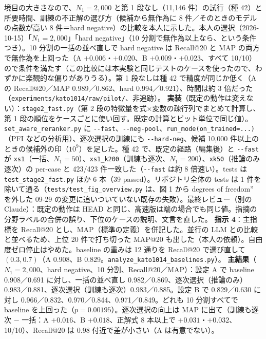 \documentclass[11pt,a4paper]{jsarticle}
\begin{document}
\begin{itemize}[nosep]
    境目の大きさなので、$N_1 = 2{,}000$ と第 1 段なし（11{,}146 件）の試行（種 42）と所要時間、訓練の不正解の選び方（候補から無作為に 8 件／そのときのモデルの点数が高い 8 件＝hard negative）の比較を本人に示した。本人の選択（2026-10-15）「$N_1 = 2{,}000$」「hard negative」（10 分割で無作為以上なら、という条件つき）。10 分割の一括の並べ直しで hard negative は Recall@20 と MAP の両方で無作為を上回った（A $+0.006$・$+0.020$、B $+0.009$・$+0.023$、すべて 10/10）ので条件を満たす（この比較には本実験と同じテストのケースを使ったので、わずかに楽観的な偏りがありうる）。第 1 段なしは種 42 で精度が同じか低く（A の Recall@20／MAP 0.989／0.862、hard 0.994／0.921）、時間は約 3 倍だった（\texttt{experiments/kato1014/raw/pilot/}、非追跡）。
    \textbf{実装}（既定の動作は変えない）：\texttt{stage2\_fast.py}（第 2 段の特徴量を式×変数の疎行列でまとめて計算し、第 1 段の順位をケースごとに使い回す。既定の計算とビット単位で同じ値）。\texttt{set\_aware\_reranker.py} に \texttt{-{}-fast}、\texttt{-{}-neg-pool}、\texttt{run\_mode(on\_trained=...)}（PFI などの分析用）、逐次選択の訓練にも \texttt{-{}-hard-neg}、候補 10{,}000 件以上のときの候補外の印（$10^9$）を足した。種 42 で、既定の経路（編集後）と \texttt{-{}-fast} が \texttt{xs1}（一括、$N_1 = 50$）、\texttt{xs1\_k200}（訓練も逐次、$N_1 = 200$）、\texttt{xk50}（推論のみ逐次）の per-case と 423/423 件一致した（\texttt{-{}-fast} は約 8 倍速い）。tests は \texttt{test\_stage2\_fast.py} ほか 6 本（39 passed）。リポジトリ全体の tests は 1 件を除いて通る（\texttt{tests/test\_fig\_overview.py} は、図 1 から degrees of freedom'' を外した 09-29 の変更に追いついていない既存の失敗）。最終レビュー（別の Claude）：既定の動作は HEAD と同じ、高速版は端の場合でも同じ値。指摘の分野ラベルの合併の誤り、下位のケースの説明、文言を直した。
    \textbf{指示 4}：主指標を Recall@20 とし、MAP（標準の定義）を併記した。並行の LLM との比較と並べるため、上位 20 件で打ち切った MAP@20 も出した（本人の依頼）。自由度ゼロ停止はやめた。baseline の重みは 12 通りを Recall@20 で選び直して $(0.3, 0.7)$（A 0.908、B 0.829。\texttt{analyze\_kato1014\_baselines.py}）。
    \textbf{主結果}（$N_1 = 2{,}000$、hard negative、10 分割、Recall@20／MAP）：設定 A で baseline 0.908／0.691 に対し、一括の並べ直し 0.982／0.869、逐次選択（推論のみ）0.983／0.881、逐次選択（訓練も逐次）0.983／0.885。設定 B で 0.829／0.630 に対し 0.966／0.832、0.970／0.844、0.971／0.849。どれも 10 分割すべてで baseline を上回った（$p = 0.00195$）。逐次選択の向上は MAP に出て（訓練も逐次 $-$ 一括：A $+0.016$、B $+0.018$、正解式 8 本以上で $+0.031$・$+0.032$、10/10）、Recall@20 は 0.98 付近で差が小さい（A は有意でない）。

\end{itemize}
\end{document}

